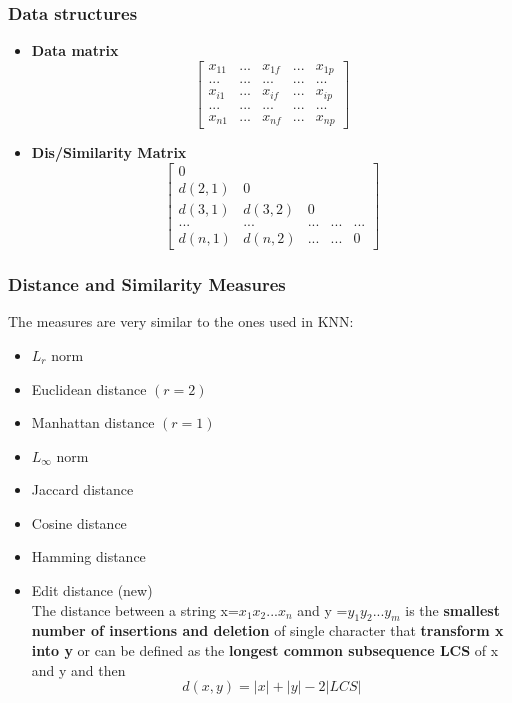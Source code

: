 \subsubsection{Data structures}
\begin{itemize}
\item \textbf{Data matrix}\\
$$ \begin{bmatrix}
 x_{11} & ... & x_{1f} & ... & x_{1p} \\
... & ... & ... & ... & ... \\
 x_{i1} & ... & x_{if} & ... & x_{ip} \\
 ... & ... & ... & ... & ... \\
  x_{n1} & ... & x_{nf} & ... & x_{np}
\end{bmatrix}
$$

\item \textbf{Dis/Similarity Matrix}\\
$$ \begin{bmatrix}
 0 &  &  &  & \\
 d(2,1) & 0 &  &  &  \\
 d(3,1) & d(3,2) & 0 &  &  \\
 ... & ... & ... & ... & ... \\
  d(n,1) & d(n,2) & ... & ... & 0
\end{bmatrix}
$$
\end{itemize}

\subsubsection{Distance and Similarity Measures}
The measures are very similar to the ones used in KNN:
\begin{itemize}
\item $L_r$ norm
\item Euclidean distance $(r=2)$
\item Manhattan distance $(r=1)$
\item $L_{\infty}$ norm
\item Jaccard distance
\item Cosine distance 
\item Hamming distance
\item Edit distance (new)\\
The distance between a string x=$x_1x_2...x_n$ and y =$y_1y_2...y_m$ is the \textbf{smallest number of insertions and deletion} of single character that \textbf{transform x into y} or can be defined as the \textbf{longest common subsequence LCS} of x and y and then $$ d(x,y) = |x| + |y| -2|LCS|$$  
\end{itemize}

